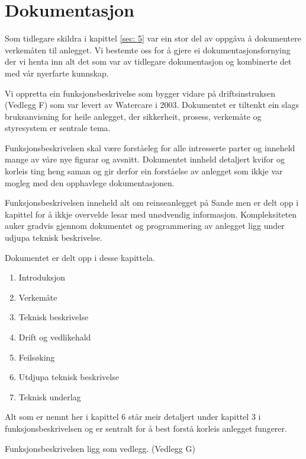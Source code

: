 \newpage
\section{Dokumentasjon}
\thispagestyle{fancy}

Som tidlegare skildra i kapittel \ref{sec: 5} var ein stor del av oppgåva å dokumentere
verkemåten til anlegget. Vi bestemte oss for å gjere ei dokumentasjonsfornying
der vi henta inn alt det som var av tidlegare dokumentasjon og kombinerte det med vår nyerfarte kunnskap.

Vi oppretta ein funksjonsbeskrivelse som bygger vidare på driftsinstruksen (Vedlegg F) som var levert av 
Watercare i 2003. Dokumentet er tiltenkt ein slags bruksanvisning for heile anlegget,
der sikkerheit, prosess, verkemåte og styresystem er sentrale tema.

Funksjonsbeskrivelsen skal være forståeleg for alle intresserte parter og inneheld 
mange av våre nye figurar og avsnitt. Dokumentet innheld detaljert kvifor og korleis
ting heng saman og gir derfor ein forståelse av anlegget som ikkje var mogleg med den opphavlege dokumentasjonen.

Funksjonsbeskrivelsen inneheld alt om reinseanlegget på Sande men er delt opp i kapittel for å ikkje
overvelde lesar med unødvendig informasjon. Kompleksiteten auker gradvis gjennom dokumentet
og programmering av anlegget ligg under udjupa teknisk beskrivelse.

Dokumentet er delt opp i desse kapittela.

\begin{enumerate}
    \item Introduksjon
    \item Verkemåte
    \item Teknisk beskrivelse
    \item Drift og vedlikehald
    \item Feilsøking
    \item Utdjupa teknisk beskrivelse
    \item Teknisk underlag
\end{enumerate}

Alt som er nemnt her i kapittel 6 står meir detaljert under kapittel 3 i funksjonsbeskrivelsen og
er sentralt for å best forstå korleis anlegget fungerer.

Funksjonsbeskrivelsen ligg som vedlegg. (Vedlegg G)